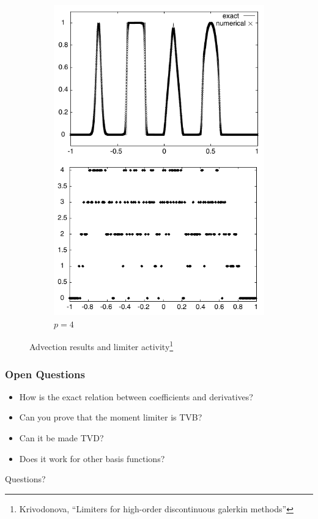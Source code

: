 \documentclass[11pt]{beamer}
\begin{document}
\begin{frame}
\begin{figure}[h]
\begin{subfigure}{0.35\textwidth}
      \includegraphics[width=\textwidth]{figures/results/moment-p-4}
      \caption{$p = 4$}
    \end{subfigure}
    \caption{Advection results and limiter activity\footnote{Krivodonova, ``Limiters for high-order discontinuous galerkin methods''}}
  \end{figure}
\end{frame}

\begin{frame}
  \frametitle{Open Questions}
  \begin{itemize}
  \item How is the exact relation between coefficients and derivatives?
  \item Can you prove that the moment limiter is TVB?
  \item Can it be made TVD?
  \item Does it work for other basis functions?
  \end{itemize}
\end{frame}

\begin{frame}[standout]
  \vfill
  \Huge{Questions?}
  \vfill
\end{frame}
\end{document}
